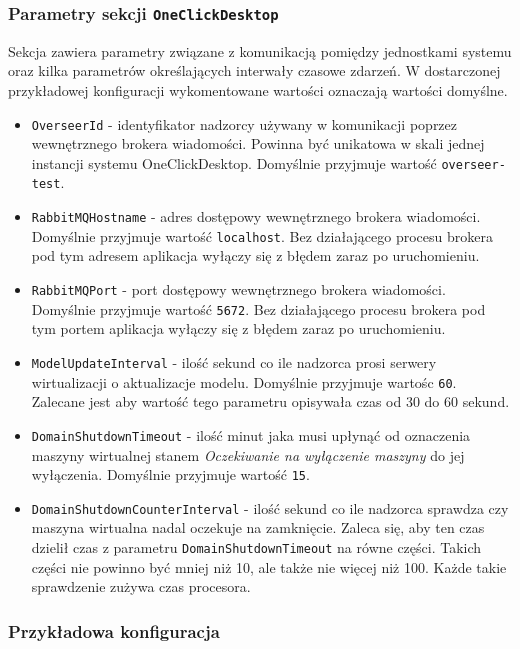 \documentclass[../opis-rozwiazania.tex]{subfiles}
\begin{document}
\subsubsection{Parametry sekcji \texttt{OneClickDesktop}}
Sekcja zawiera parametry związane z komunikacją pomiędzy jednostkami systemu oraz kilka parametrów określających interwały czasowe zdarzeń.
W dostarczonej przykładowej konfiguracji wykomentowane wartości oznaczają wartości domyślne.
\begin{itemize}
  \item \texttt{OverseerId} - identyfikator nadzorcy używany w komunikacji poprzez wewnętrznego brokera wiadomości. Powinna być unikatowa w skali jednej instancji systemu OneClickDesktop. Domyślnie przyjmuje wartość \texttt{overseer-test}.
  \item \texttt{RabbitMQHostname} - adres dostępowy wewnętrznego brokera wiadomości. Domyślnie przyjmuje wartość \texttt{localhost}. Bez działającego procesu brokera pod tym adresem aplikacja wyłączy się z błędem zaraz po uruchomieniu.
  \item \texttt{RabbitMQPort} - port dostępowy wewnętrznego brokera wiadomości. Domyślnie przyjmuje wartość \texttt{5672}. Bez działającego procesu brokera pod tym portem aplikacja wyłączy się z błędem zaraz po uruchomieniu.
  \item \texttt{ModelUpdateInterval} - ilość sekund co ile nadzorca prosi serwery wirtualizacji o aktualizacje modelu. Domyślnie przyjmuje wartośc \texttt{60}. Zalecane jest aby wartość tego parametru opisywała czas od 30 do 60 sekund.																												%
  \item \texttt{DomainShutdownTimeout} - ilość minut jaka musi upłynąć od oznaczenia maszyny wirtualnej stanem \textit{Oczekiwanie na wyłączenie maszyny} do jej wyłączenia. Domyślnie przyjmuje wartość \texttt{15}.
  \item \texttt{DomainShutdownCounterInterval} - ilość sekund co ile nadzorca sprawdza czy maszyna wirtualna nadal oczekuje na zamknięcie. Zaleca się, aby ten czas dzielił czas z parametru \texttt{DomainShutdownTimeout} na równe części. Takich części nie powinno być mniej niż 10, ale także nie więcej niż 100. Każde takie sprawdzenie zużywa czas procesora.
\end{itemize}

\subsubsection{Przykładowa konfiguracja}
\end{document}
